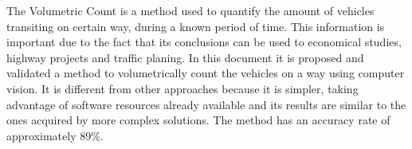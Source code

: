 
The Volumetric Count is a method used to quantify the amount of vehicles transiting on certain way, during a known period of time. This information is important due to the fact that its conclusions can be used to economical studies, highway projects and traffic planing. In this document it is proposed and validated a method to volumetrically count the vehicles on a way using computer vision. It is different from other approaches because it is simpler, taking advantage of software resources already available and its results are similar to the ones acquired by more complex solutions. The method has an accuracy rate of approximately 89\%.

